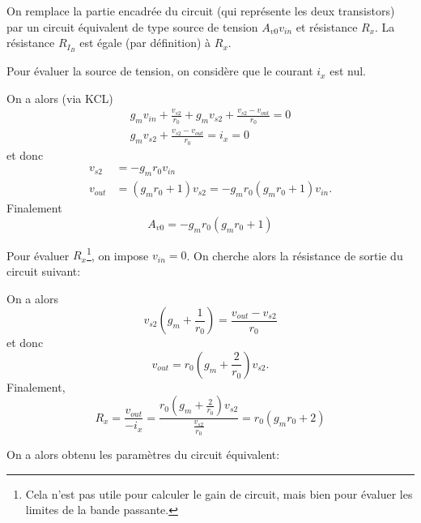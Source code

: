 \documentclass[frenchb,DIV=14]{scrartcl}
\begin{document}
On remplace la partie encadrée du circuit (qui représente les deux transistors)
par un circuit équivalent de type source de tension $A_{v0}v_{in}$ et résistance $R_{x}$.
La résistance $R_{I_B}$ est égale (par définition) à $R_{x}$.

Pour évaluer la source de tension, on considère que le courant $i_x$
est nul.

On a alors (via KCL)
\begin{gather*}
    g_m v_{in} + \frac{v_{s2}}{r_0} + g_m v_{s2} + \frac{v_{s2} - v_{out}}{r_0} = 0 \\
    g_m v_{s2} + \frac{v_{s2} - v_{out}}{r_0} = i_x = 0
\end{gather*}
et donc
\begin{align*}
    v_{s2} &= -g_m r_0 v_{in} \\
    v_{out} &= (g_m r_0 + 1) v_{s2} = -g_m r_0 (g_m r_0 + 1) v_{in}.
\end{align*}
Finalement
\[A_{v0} = -g_m r_0 (g_m r_0 + 1)\]

Pour évaluer $R_{x}$\footnote{
    Cela n'est pas utile pour calculer le gain de circuit, mais bien pour
    évaluer les limites de la bande passante.},
on impose $v_{in} = 0$. On cherche alors la résistance de sortie du circuit suivant:
\begin{center}
\end{center}

On a alors
\[v_{s2} \left(g_m + \frac{1}{r_0}\right) = \frac{v_{out} - v_{s2}}{r_0}\]
et donc \[v_{out}=  r_0 \left(g_m + \frac{2}{r_0}\right) v_{s2}.\]
Finalement,
\[R_x = \frac{v_{out}}{-i_x} = \frac{r_0 \left(g_m + \frac{2}{r_0}\right) v_{s2}}{\frac{v_{s2}}{r_0}} = r_0 (g_m r_0 + 2)\]

On a alors obtenu les paramètres du circuit équivalent:
\begin{center}
\end{center}
\end{document}
